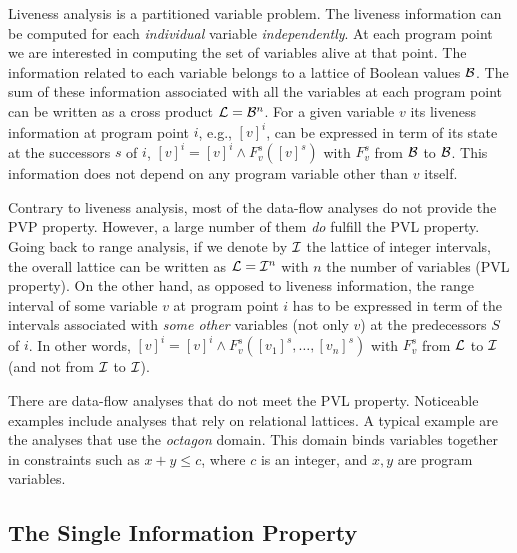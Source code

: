 Liveness analysis is a partitioned variable problem. 
The liveness information can be computed for each \emph{individual} variable \emph{independently}. 
At each program point we are interested in computing the set of variables alive at that point.
The information related to each variable belongs to a lattice of Boolean values ${\cal B}$.
The sum of these information associated with all the variables at each program point can be written as a cross product ${\cal L}={\cal B}^n$.
For a given variable $v$ its liveness information at program point $i$, e.g., $[v]^i$, can be expressed in term of its state at the successors $s$ of $i$,
$[v]^i = [v]^i \wedge F_v^s([v]^s)$ with $F_v^s$ from $\cal B$ to $\cal B$.
This information does not depend on any program variable other than $v$ itself.

Contrary to liveness analysis, most of the data-flow analyses do not provide the PVP property.
However, a large number of them \emph{do} fulfill the PVL property.
Going back to range analysis, if we denote by $\cal I$ the lattice of integer intervals, the overall lattice can be written as ${\cal L}={\cal I}^n$ with $n$ the number of variables (PVL property).
On the other hand, as opposed to liveness information, the range interval of some variable $v$ at program point $i$ has to be expressed in term of the intervals associated with \emph{some other} variables (not only $v$) at the predecessors $S$ of $i$.
In other words,  $[v]^i = [v]^i \wedge  F_v^s([v_1]^s,\dots,[v_n]^s)$ with $F_v^s$ from $\cal L$ to $\cal I$ (and not from $\cal I$ to $\cal I$).

There are data-flow analyses that do not meet the PVL property.
Noticeable examples include analyses that rely on relational lattices.
A typical example are the analyses that use the {\em octagon} domain.
This domain binds variables together in constraints such as $x + y \leq c$, where $c$ is an integer, and $x, y$ are program variables.


\subsection{The Single Information Property}
\label{sec:ssi:pereira:singProp}

